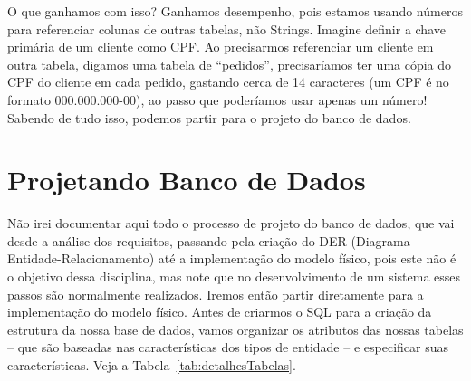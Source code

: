 O que ganhamos com isso? Ganhamos desempenho, pois estamos usando números para referenciar colunas de outras tabelas, não Strings. Imagine definir a chave primária de um cliente como CPF. Ao precisarmos referenciar um cliente em outra tabela, digamos uma tabela de ``pedidos'', precisaríamos ter uma cópia do CPF do cliente em cada pedido, gastando cerca de 14 caracteres (um CPF é no formato 000.000.000-00), ao passo que poderíamos usar apenas um número! Sabendo de tudo isso, podemos partir para o projeto do banco de dados.


\section{Projetando Banco de Dados}

Não irei documentar aqui todo o processo de projeto do banco de dados, que vai desde a análise dos requisitos, passando pela criação do DER (Diagrama Entidade-Relacionamento) até a implementação do modelo físico, pois este não é o objetivo dessa disciplina, mas note que no desenvolvimento de um sistema esses passos são normalmente realizados. Iremos então partir diretamente para a implementação do modelo físico. Antes de criarmos o SQL para a criação da estrutura da nossa base de dados, vamos organizar os atributos das nossas tabelas – que são baseadas nas características dos tipos de entidade – e especificar suas características. Veja a Tabela~\ref{tab:detalhesTabelas}.



